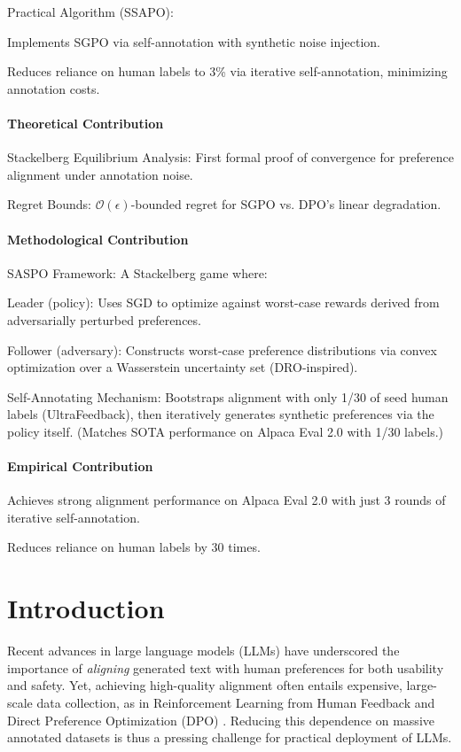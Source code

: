 Practical Algorithm (SSAPO):

Implements SGPO via self-annotation with synthetic noise injection.


Reduces reliance on human labels to 3\% via iterative self-annotation, minimizing annotation costs.


\paragraph{Theoretical Contribution}
Stackelberg Equilibrium Analysis: First formal proof of convergence for preference alignment under annotation noise.

Regret Bounds: 
$\mathcal{O}(\epsilon)$-bounded regret for SGPO vs. DPO’s linear degradation.

\paragraph{Methodological Contribution}
SASPO Framework: A Stackelberg game where:

Leader (policy): Uses SGD to optimize against worst-case rewards derived from adversarially perturbed preferences.

Follower (adversary): Constructs worst-case preference distributions via convex optimization over a Wasserstein uncertainty set (DRO-inspired).

Self-Annotating Mechanism: Bootstraps alignment with only 1/30 of seed human labels (UltraFeedback), then iteratively generates synthetic preferences via the policy itself.
(Matches SOTA performance on Alpaca Eval 2.0 with 1/30 labels.)


\paragraph{Empirical Contribution}

Achieves strong alignment performance on Alpaca Eval 2.0 with just 3 rounds of iterative self-annotation.

Reduces reliance on human labels by 30 times. %



\section{Introduction}
\label{sec:intro}

Recent advances in large language models (LLMs) have underscored the importance of \emph{aligning} generated text with human preferences for both usability and safety. Yet, achieving high-quality alignment often entails expensive, large-scale data collection, as in Reinforcement Learning from Human Feedback \cite{Christiano2017DeepRLHF} and Direct Preference Optimization (DPO) \cite{Rafailov2023DirectPreference}. Reducing this dependence on massive annotated datasets is thus a pressing challenge for practical deployment of LLMs.

